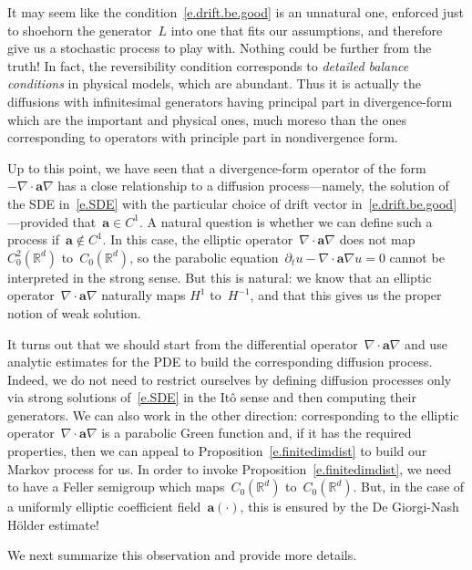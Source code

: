 \documentclass[11pt]{article} %
\numberwithin{equation}{section}
\theoremstyle{definition}
\newcommand*{\Rd}{\ensuremath{\mathbb{R}^d}}
\renewcommand{\a}{\mathbf{a}}
\begin{document}
\smallskip

It may seem like the condition~\eqref{e.drift.be.good} is an unnatural one, enforced just to shoehorn the generator~$L$ into one that fits our assumptions, and therefore give us a stochastic process to play with. Nothing could be further from the truth! In fact, the reversibility condition corresponds to \emph{detailed balance conditions} in physical models, which are abundant. Thus it is actually the diffusions with infinitesimal generators having principal part in divergence-form which are the important and physical ones, much moreso than the ones corresponding to operators with principle part in nondivergence form. 

\smallskip

Up to this point, we have seen that a divergence-form operator of the form~$-\nabla \cdot \a\nabla$ has a close relationship to a diffusion process---namely, the solution of the SDE in~\eqref{e.SDE} with the particular choice of drift vector in~\eqref{e.drift.be.good}---provided that~$\a \in C^1$. A natural question is whether we can define such a process if~$\a\not\in C^1$. In this case, the elliptic operator~$\nabla \cdot \a\nabla$ does not map~$C^2_0(\Rd)$ to~$C_0(\Rd)$, so the parabolic equation~$\partial_t u - \nabla\cdot \a\nabla u = 0$ cannot be interpreted in the strong sense. But this is natural: we know that an elliptic operator~$\nabla \cdot \a\nabla$ naturally maps $H^1$ to~$H^{-1}$, and that this gives us the proper notion of weak solution. 

\smallskip

It turns out that we should start from the differential operator~$\nabla \cdot\a\nabla$ and use analytic estimates for the PDE to build the corresponding diffusion process. Indeed, we do not need to restrict ourselves by defining diffusion processes only via strong solutions of~\eqref{e.SDE} in the It\^o sense and then computing their generators. We can also work in the other direction: corresponding to the elliptic operator~$\nabla \cdot \a\nabla$ is a parabolic Green function and, if it has the required properties, then we can appeal to Proposition~\ref{e.finitedimdist} to build our Markov process for us. In order to invoke Proposition~\ref{e.finitedimdist}, we need to have a Feller semigroup which maps~$C_0(\Rd)$ to~$C_0(\Rd)$. But, in the case of a uniformly elliptic coefficient field~$\a(\cdot)$, this is ensured by the De Giorgi-Nash H\"older estimate! 

\smallskip

We next summarize this observation and provide more details. 
\end{document}
